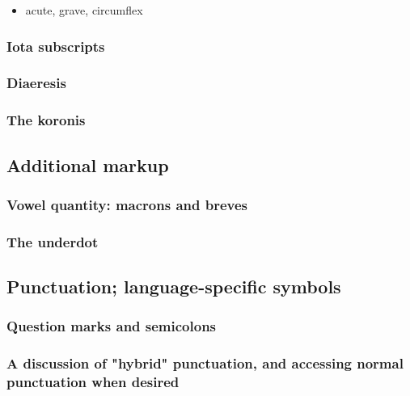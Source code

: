 \documentclass[11pt]{article}
\begin{document}
\begin{itemize}
\item acute, grave, circumflex
\end{itemize}

\subsubsection{Iota subscripts}
\label{sec:org08ddeee}

\subsubsection{Diaeresis}
\label{sec:org16b7214}

\subsubsection{The koronis}
\label{sec:orgb1265b8}

\subsection{Additional markup}
\label{sec:org75a2b15}

\subsubsection{Vowel quantity: macrons and breves}
\label{sec:orgc6ec23e}

\subsubsection{The underdot}
\label{sec:org6c20845}

\subsection{Punctuation; language-specific symbols}
\label{sec:orga9dc617}

\subsubsection{Question marks and semicolons}
\label{sec:org6f2fc8d}

\subsubsection{A discussion of "hybrid" punctuation, and accessing normal punctuation when desired}
\label{sec:org5edb403}
\end{document}
